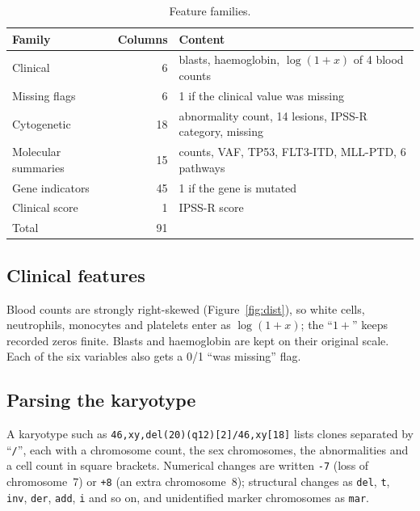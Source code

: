 \documentclass[11pt,a4paper]{article}
\begin{document}
\begin{table}[H]
\centering
\caption{Feature families.}
\label{tab:families}
\begin{tabular}{lrl}
\toprule
Family & Columns & Content \\
\midrule
Clinical            & 6  & blasts, haemoglobin, $\log(1+x)$ of 4 blood counts \\
Missing flags       & 6  & 1 if the clinical value was missing \\
Cytogenetic         & 18 & abnormality count, 14 lesions, IPSS-R category, missing \\
Molecular summaries & 15 & counts, VAF, TP53, FLT3-ITD, MLL-PTD, 6 pathways \\
Gene indicators     & 45 & 1 if the gene is mutated \\
Clinical score      & 1  & IPSS-R score \\
\midrule
Total               & 91 & \\
\bottomrule
\end{tabular}
\end{table}

\subsection{Clinical features}
Blood counts are strongly right-skewed (Figure~\ref{fig:dist}), so white cells,
neutrophils, monocytes and platelets enter as $\log(1+x)$; the ``$1+$'' keeps recorded
zeros finite. Blasts and haemoglobin are kept on their original scale. Each of the six
variables also gets a 0/1 ``was missing'' flag.

\subsection{Parsing the karyotype}
A karyotype such as \texttt{46,xy,del(20)(q12)[2]/46,xy[18]} lists clones separated by
``\texttt{/}'', each with a chromosome count, the sex chromosomes, the abnormalities and
a cell count in square brackets. Numerical changes are written \texttt{-7} (loss of
chromosome~7) or \texttt{+8} (an extra chromosome~8); structural changes as
\texttt{del}, \texttt{t}, \texttt{inv}, \texttt{der}, \texttt{add}, \texttt{i} and so on,
and unidentified marker chromosomes as \texttt{mar}.
\end{document}

